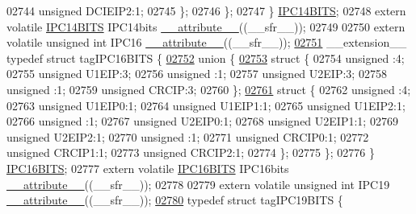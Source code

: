 \begin{DoxyCode}
02744       \textcolor{keywordtype}{unsigned} DCIEIP2:1;
02745     \};
02746   \};
02747 \} \hyperlink{a00008_dd/d4d/a00519}{IPC14BITS};
02748 \textcolor{keyword}{extern} \textcolor{keyword}{volatile} \hyperlink{a00008_dd/d4d/a00519}{IPC14BITS} IPC14bits \hyperlink{a00009_a493c46f03454991ccc5aa7a6e1dfb2a7}{\_\_attribute\_\_}((\_\_sfr\_\_));
02749 
02750 \textcolor{keyword}{extern} \textcolor{keyword}{volatile} \textcolor{keywordtype}{unsigned} \textcolor{keywordtype}{int}  IPC16 \hyperlink{a00009_a493c46f03454991ccc5aa7a6e1dfb2a7}{\_\_attribute\_\_}((\_\_sfr\_\_));
\hypertarget{a00009_source_l02751}{}\hyperlink{a00008}{02751} \_\_extension\_\_ \textcolor{keyword}{typedef} \textcolor{keyword}{struct }tagIPC16BITS \{
\hypertarget{a00009_source_l02752}{}\hyperlink{a00009}{02752}   \textcolor{keyword}{union }\{
\hypertarget{a00009_source_l02753}{}\hyperlink{a00009}{02753}     \textcolor{keyword}{struct }\{
02754       \textcolor{keywordtype}{unsigned} :4;
02755       \textcolor{keywordtype}{unsigned} U1EIP:3;
02756       \textcolor{keywordtype}{unsigned} :1;
02757       \textcolor{keywordtype}{unsigned} U2EIP:3;
02758       \textcolor{keywordtype}{unsigned} :1;
02759       \textcolor{keywordtype}{unsigned} CRCIP:3;
02760     \};
\hypertarget{a00009_source_l02761}{}\hyperlink{a00009}{02761}     \textcolor{keyword}{struct }\{
02762       \textcolor{keywordtype}{unsigned} :4;
02763       \textcolor{keywordtype}{unsigned} U1EIP0:1;
02764       \textcolor{keywordtype}{unsigned} U1EIP1:1;
02765       \textcolor{keywordtype}{unsigned} U1EIP2:1;
02766       \textcolor{keywordtype}{unsigned} :1;
02767       \textcolor{keywordtype}{unsigned} U2EIP0:1;
02768       \textcolor{keywordtype}{unsigned} U2EIP1:1;
02769       \textcolor{keywordtype}{unsigned} U2EIP2:1;
02770       \textcolor{keywordtype}{unsigned} :1;
02771       \textcolor{keywordtype}{unsigned} CRCIP0:1;
02772       \textcolor{keywordtype}{unsigned} CRCIP1:1;
02773       \textcolor{keywordtype}{unsigned} CRCIP2:1;
02774     \};
02775   \};
02776 \} \hyperlink{a00008_d8/d14/a00522}{IPC16BITS};
02777 \textcolor{keyword}{extern} \textcolor{keyword}{volatile} \hyperlink{a00008_d8/d14/a00522}{IPC16BITS} IPC16bits \hyperlink{a00009_a493c46f03454991ccc5aa7a6e1dfb2a7}{\_\_attribute\_\_}((\_\_sfr\_\_));
02778 
02779 \textcolor{keyword}{extern} \textcolor{keyword}{volatile} \textcolor{keywordtype}{unsigned} \textcolor{keywordtype}{int}  IPC19 \hyperlink{a00009_a493c46f03454991ccc5aa7a6e1dfb2a7}{\_\_attribute\_\_}((\_\_sfr\_\_));
\hypertarget{a00009_source_l02780}{}\hyperlink{a00008}{02780} \textcolor{keyword}{typedef} \textcolor{keyword}{struct }tagIPC19BITS \{

\end{DoxyCode}
